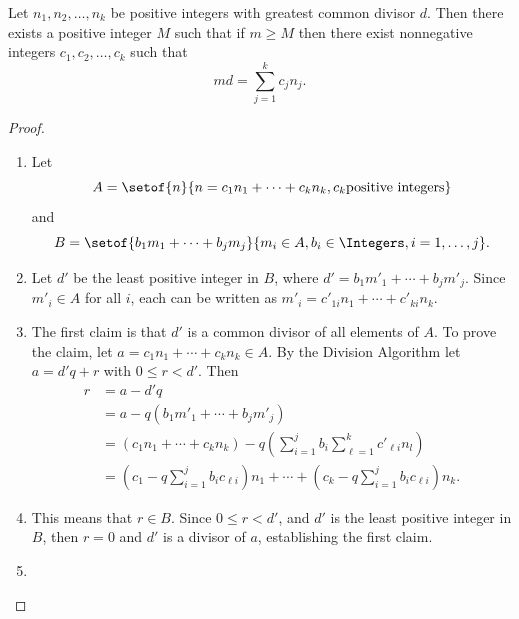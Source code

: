 \documentclass[12pt]{article}
\begin{document}
\begin{lemma}
    \label{lem:stationarydistributions:numtheory} Let \( n_1, n_{2},
    \dots, n_k \) be positive integers with greatest common divisor \( d
    \).  Then there exists a positive integer \( M \) such that if \( m
    \ge M \) then there exist nonnegative integers \( c_1, c_2, \dots, c_k
    \) such that
    \[
        md = \sum\limits_{j=1}^k c_j n_j.
    \]
\end{lemma}
\begin{proof}
    \begin{enumerate}
        \item
            Let
            \[
                A = \setof{n}{n=c_1n_1 + \cdots + c_k n_k, c_k \text{%
                positive integers}}
            \] and
            \[
                B = \setof{b_1 m_1 + \cdots + b_j m_j}{ m_i \in A , b_i
                \in \Integers, i=1,\dots, j}.
            \]
        \item
            Let \( d' \) be the least positive integer in \( B \), where
            \( d' = b_1 m'_1 + \cdots + b_j m'_j \).  Since \( m'_i \in
            A \) for all \( i \), each can be written as \( m'_i = c'_{1i}n_1
            + \cdots + c'_{ki}n_k \).
        \item
            The first claim is that \( d' \) is a common divisor of all
            elements of \( A \).  To prove the claim, let \( a = c_1 n_1
            + \cdots + c_k n_k \in A \).  By the Division Algorithm let \(
            a = d'q + r \) with \( 0 \le r < d' \).  Then
            \begin{align*}
                r &= a - d' q \\
                &= a - q (b_1 m'_1 + \cdots + b_j m'_j) \\
                &= (c_1 n_1 + \cdots + c_k n_k) - q \left(\sum\limits_{i=1}^j
                b_i\sum\limits_{\ell=1}^k c'_{\ell i} n_l \right) \\
                &= \left( c_1 - q \sum\limits_{i=1}^j b_i c_{\ell i}
                \right) n_1 + \cdots + \left( c_k - q \sum\limits_{i=1}^j
                b_i c_{\ell i} \right) n_k.
            \end{align*}
        \item
            This means that \( r \in B \).  Since \( 0 \le r < d' \),
            and \( d' \) is the least positive integer in \( B \), then \(
            r = 0 \) and \( d' \) is a divisor of \( a \), establishing
            the first claim.
        \item

\end{enumerate}
\end{proof}
\end{document}
